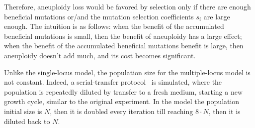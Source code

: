 \documentclass[12pt]{extarticle}
\begin{document}
Therefore, aneuploidy loss would be favored by selection only if there are enough beneficial mutations or/and the mutation selection coefficients $s_i$ are large enough. The intuition is as follows: when the benefit of the accumulated beneficial mutations is small, then the benefit of aneuploidy has a large effect; when the benefit of the accumulated beneficial mutations benefit is large, then aneuploidy doesn’t add much, and its cost becomes significant.

Unlike the single-locus model, the population size for the multiple-locus model is not constant. Indeed, a serial-transfer protocol~\citep{Barrick2013} is simulated, where the population is repeatedly diluted by transfer to a fresh medium, starting a new growth cycle, similar to the original experiment. In the model the population initial size is $N$, then it is doubled every iteration till reaching $8\cdot{N}$, then it is diluted back to $N$.
\end{document}
